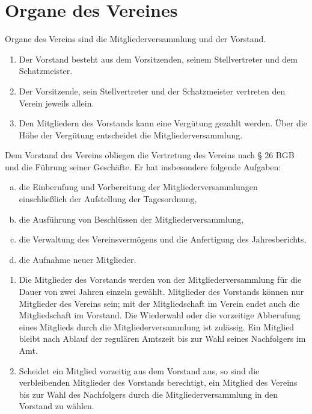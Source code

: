 \documentclass{scrartcl}
\begin{document}
\section{Organe des Vereines}
\begin{contract}
Organe des Vereins sind die Mitgliederversammlung und der Vorstand.

\begin{enumerate}
    \item Der Vorstand besteht aus dem Vorsitzenden, seinem Stellvertreter und dem Schatzmeister.
    \item Der Vorsitzende, sein Stellvertreter und der Schatzmeister vertreten den Verein jeweils allein.
    \item Den Mitgliedern des Vorstands kann eine Vergütung gezahlt werden. Über die Höhe der Vergütung entscheidet die Mitgliederversammlung.
\end{enumerate}

Dem Vorstand des Vereins obliegen die Vertretung des Vereins nach § 26 BGB und die
Führung seiner Geschäfte. Er hat insbesondere folgende Aufgaben: 
\begin{enumerate}[(a)]
    \item die Einberufung und Vorbereitung der Mitgliederversammlungen einschließlich der Aufstellung der Tagesordnung,
    \item die Ausführung von Beschlüssen der Mitgliederversammlung,
    \item die Verwaltung des Vereinsvermögens und die Anfertigung des Jahresberichts,
    \item die Aufnahme neuer Mitglieder.
\end{enumerate} 

\begin{enumerate}
    \item Die Mitglieder des Vorstands werden von der Mitgliederversammlung für die Dauer von zwei Jahren einzeln gewählt. Mitglieder des Vorstands können nur Mitglieder des Vereins sein; mit der Mitgliedschaft im Verein endet auch die Mitgliedschaft im Vorstand. Die Wiederwahl oder die vorzeitige Abberufung eines Mitglieds durch die Mitgliederversammlung    ist zulässig. Ein Mitglied bleibt nach Ablauf der regulären Amtszeit bis zur Wahl seines Nachfolgers im Amt.
    \item Scheidet ein Mitglied vorzeitig aus dem Vorstand aus, so sind die verbleibenden Mitglieder des Vorstands berechtigt, ein Mitglied des Vereins bis zur Wahl des Nachfolgers durch die Mitgliederversammlung in den Vorstand zu wählen.
\end{enumerate}


\end{contract}
\end{document}
